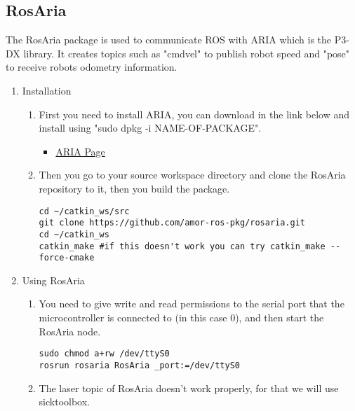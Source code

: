 \documentclass{article}
\begin{document}
\subsection{RosAria}
The RosAria package is used to communicate ROS with ARIA which is the P3-DX
library. It creates topics such as "cmdvel" to publish robot speed and "pose"
to receive robots odometry information.\newline
\begin{enumerate}

\item Installation
\begin{enumerate}
\item First you need to install ARIA, you can download in the link below and
install using "sudo dpkg -i NAME-OF-PACKAGE".
\begin{itemize}
\item \href{http://robots.mobilerobots.com/wiki/ARIA}{ARIA Page}
\end{itemize}
\item Then you go to your source workspace directory and clone the RosAria
repository to it, then you build the package.
\begin{lstlisting}
cd ~/catkin_ws/src
git clone https://github.com/amor-ros-pkg/rosaria.git
cd ~/catkin_ws
catkin_make #if this doesn't work you can try catkin_make --force-cmake
\end{lstlisting}
\end{enumerate}

\item Using RosAria
\begin{enumerate}
\item You need to give write and read permissions to the serial port that the
microcontroller is connected to (in this case 0),
and then start the RosAria node.
\begin{lstlisting}
sudo chmod a+rw /dev/ttyS0
rosrun rosaria RosAria _port:=/dev/ttyS0
\end{lstlisting}
\item The laser topic of RosAria doesn't work properly, for that we will use
sicktoolbox.
\end{enumerate}
\end{enumerate}
\end{document}

